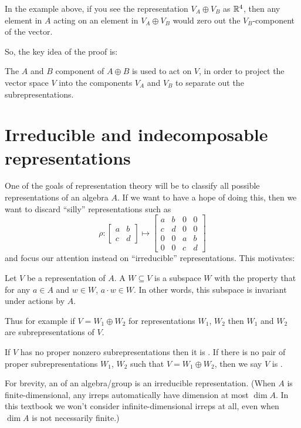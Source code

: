 In the example above, if you see the representation $V_A \oplus V_B$ as $\mathbb R^4$,
then any element in $A$ acting on an element in $V_A \oplus V_B$ would zero out
the $V_B$-component of the vector.

So, the key idea of the proof is:
\begin{moral}
	The $A$ and $B$ component of $A \oplus B$ is used to act on $V$,
	in order to project the vector space $V$ into the components $V_A$ and
	$V_B$ to separate out the subrepresentations.
\end{moral}

\section{Irreducible and indecomposable representations}

One of the goals of representation theory will be to classify
all possible representations of an algebra $A$.
If we want to have a hope of doing this,
then we want to discard ``silly'' representations such as
\[
	\rho :
	\begin{bmatrix} a & b \\ c & d \end{bmatrix}
	\mapsto
	\begin{bmatrix} a & b & 0 & 0 \\ c & d & 0 & 0 \\
		0 & 0 & a & b \\ 0 & 0 & c & d \end{bmatrix}
\]
and focus our attention instead on ``irreducible'' representations.
This motivates:
\begin{definition}
	Let $V$ be a representation of $A$.
	A  $W \subseteq V$ is a subspace $W$
	with the property that for any $a \in A$ and $w \in W$,
	$a \cdot w \in W$.
	In other words, this subspace is invariant under actions by $A$.
\end{definition}
Thus for example if $V = W_1 \oplus W_2$ for representations $W_1$, $W_2$
then $W_1$ and $W_2$ are subrepresentations of $V$.

\begin{definition}
	If $V$ has no proper nonzero subrepresentations then it is .
	If there is no pair of proper subrepresentations $W_1$, $W_2$ such that $V = W_1 \oplus W_2$,
	then we say $V$ is .
\end{definition}
\begin{definition}
	For brevity, an  of an algebra/group is an irreducible representation.
	(When $A$ is finite-dimensional, any irreps automatically have dimension at most $\dim A$.
	In this textbook we won't consider infinite-dimensional irreps at all,
	even when $\dim A$ is not necessarily finite.)
\end{definition}

